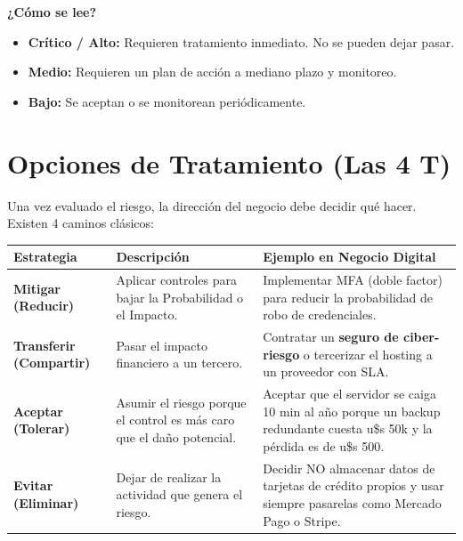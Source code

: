 \documentclass[12pt,a4paper]{article}
\renewcommand{\arraystretch}{1.25}
\begin{document}
\vspace{8pt}
\textbf{¿C\'omo se lee?}
\begin{itemize}[leftmargin=2em]
    \item \textcolor{red!80!black}{\textbf{Cr\'itico / Alto:}} Requieren tratamiento inmediato. No se pueden dejar pasar.
    \item \textcolor{orange!80!black}{\textbf{Medio:}} Requieren un plan de acci\'on a mediano plazo y monitoreo.
    \item \textcolor{green!60!black}{\textbf{Bajo:}} Se aceptan o se monitorean peri\'odicamente.
\end{itemize}

\newpage
\section{Opciones de Tratamiento (Las 4 T)}

Una vez evaluado el riesgo, la direcci\'on del negocio debe decidir qu\'e hacer. Existen 4 caminos cl\'asicos:

\renewcommand{\arraystretch}{1.6}
\begin{tabularx}{\textwidth}{|>{\bfseries\color{azulUCA}}p{3cm}|X|p{4cm}|}
\hline
\rowcolor{grisClaro}
\textbf{Estrategia} & \textbf{Descripci\'on} & \textbf{Ejemplo en Negocio Digital} \\
\hline
\textbf{Mitigar} (Reducir) & Aplicar controles para bajar la Probabilidad o el Impacto. & Implementar MFA (doble factor) para reducir la probabilidad de robo de credenciales. \\
\hline
\textbf{Transferir} (Compartir) & Pasar el impacto financiero a un tercero. & Contratar un \textbf{seguro de ciber-riesgo} o tercerizar el hosting a un proveedor con SLA. \\
\hline
\textbf{Aceptar} (Tolerar) & Asumir el riesgo porque el control es m\'as caro que el da\~no potencial. & Aceptar que el servidor se caiga 10 min al a\~no porque un backup redundante cuesta u\$s 50k y la p\'erdida es de u\$s 500. \\
\hline
\textbf{Evitar} (Eliminar) & Dejar de realizar la actividad que genera el riesgo. & Decidir NO almacenar datos de tarjetas de cr\'edito propios y usar siempre pasarelas como Mercado Pago o Stripe. \\
\hline
\end{tabularx}
\end{document}
